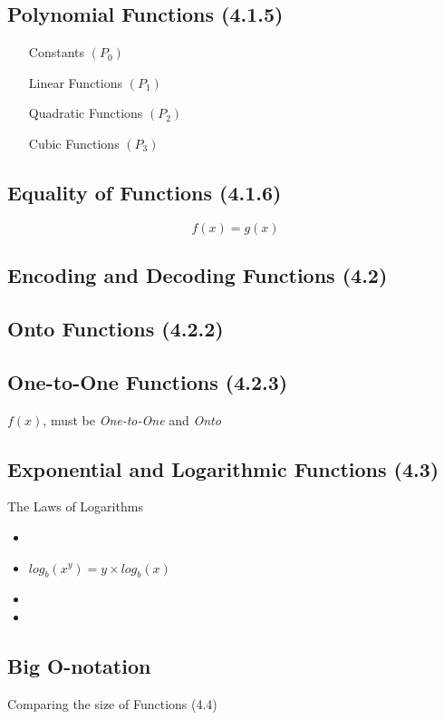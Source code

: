 \documentclass[]{report}
\begin{document}
\subsection*{Polynomial Functions (4.1.5)}

\begin{itemize}
	\item[Constants] $(P_0)$
	\item[Linear Functions] $(P_1)$
	\item[Quadratic Functions] $(P_2)$
	\item[Cubic Functions] $(P_3)$
\end{itemize}


\subsection*{Equality of Functions (4.1.6)}
\[f(x) = g(x) \]


\subsection*{Encoding and Decoding Functions (4.2)}


\subsection*{Onto Functions (4.2.2)}

\subsection*{One-to-One Functions (4.2.3)}
$f(x)$, must be \emph{One-to-One} and \emph{Onto}



\subsection*{Exponential and Logarithmic Functions (4.3)}

The Laws of Logarithms
\begin{itemize}
	\item
	\item $log_b(x^y) = y \times log_b(x)$
	\item
	\item
\end{itemize}

\subsection*{Big O-notation}
Comparing the size of Functions (4.4)
\end{document}
